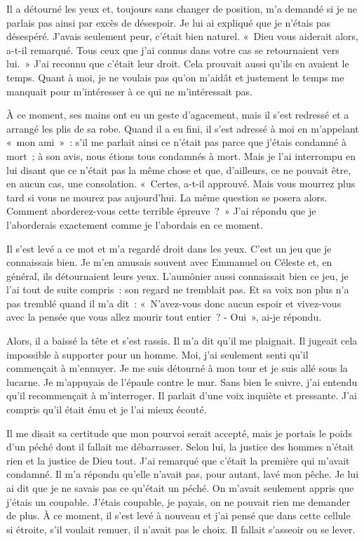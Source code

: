 \documentclass[french,twoside]{book} %
\begin{document}
Il a détourné les yeux et, toujours sans changer de position, m’a demandé si je ne parlais pas ainsi par excès de désespoir. Je lui ai expliqué que je n’étais pas désespéré. J'avais seulement peur, c’était bien naturel. « Dieu vous aiderait alors, a-t-il remarqué. Tous ceux que j’ai connus dans votre cas se retournaient vers lui. » J'ai reconnu que c’était leur droit. Cela prouvait aussi qu’ils en avaient le temps. Quant à moi, je ne voulais pas qu’on m’aidât et justement le temps me manquait pour m’intéresser à ce qui ne m’intéressait pas.\par
À ce moment, ses mains ont eu un geste d’agacement, mais il s’est redressé et a arrangé les plis de sa robe. Quand il a eu fini, il s’est adressé à moi en m’appelant « mon ami » : s’il me parlait ainsi ce n’était pas parce que j’étais condamné à mort ; à son avis, nous étions tous condamnés à mort. Mais je l’ai interrompu en lui disant que ce n’était pas la même chose et que, d’ailleurs, ce ne pouvait être, en aucun cas, une consolation. « Certes, a-t-il approuvé. Mais vous mourrez plus tard si vous ne mourez pas aujourd’hui. La même question se posera alors. Comment aborderez-vous cette terrible épreuve ? » J'ai répondu que je l’aborderais exactement comme je l’abordais en ce moment.\par
Il s’est levé a ce mot et m’a regardé droit dans les yeux. C'est un jeu que je connaissais bien. Je m’en amusais souvent avec Emmanuel ou Céleste et, en général, ils détournaient leurs yeux. L'aumônier aussi connaissait bien ce jeu, je l’ai tout de suite compris : son regard ne tremblait pas. Et sa voix non plus n’a pas tremblé quand il m’a dit : « N'avez-vous donc aucun espoir et vivez-vous avec la pensée que vous allez mourir tout entier ? - Oui », ai-je répondu.\par
Alors, il a baissé la tête et s’est rassis. Il m’a dit qu’il me plaignait. Il jugeait cela impossible à supporter pour un homme. Moi, j’ai seulement senti qu’il commençait à m’ennuyer. Je me suis détourné à mon tour et je suis allé sous la lucarne. Je m’appuyais de l’épaule contre le mur. Sans bien le suivre, j’ai entendu qu’il recommençait à m’interroger. Il parlait d’une voix inquiète et pressante. J'ai compris qu’il était ému et je l’ai mieux écouté.\par
Il me disait sa certitude que mon pourvoi serait accepté, mais je portais le poids d’un péché dont il fallait me débarrasser. Selon lui, la justice des hommes n’était rien et la justice de Dieu tout. J'ai remarqué que c’était la première qui m’avait condamné. Il m’a répondu qu’elle n’avait pas, pour autant, lavé mon pêche. Je lui ai dit que je ne savais pas ce qu’était un péché. On m’avait seulement appris que j’étais un coupable. J'étais coupable, je payais, on ne pouvait rien me demander de plus. À ce moment, il s’est levé à nouveau et j’ai pensé que dans cette cellule si étroite, s’il voulait remuer, il n’avait pas le choix. Il fallait s’asseoir ou se lever.\par
\end{document}
